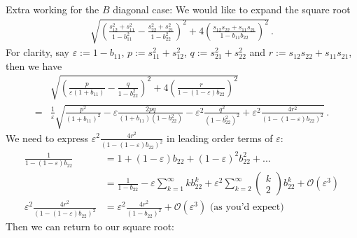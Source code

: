 Extra working for the $B$ diagonal case:
\label{extra_working}
We would like to expand the square root
\begin{align*}
\sqrt{\left(\frac{s_{12}^2+s_{11}^2}{1-b_{11}^2}-\frac{s_{22}^2+s_{21}^2}{1-b_{22}^2}\right)^2+4\left(\frac{s_{12}s_{22}+s_{11}s_{21}}{1-b_{11}b_{22}}\right)^2}\,.
\end{align*}
For clarity, say $\varepsilon:=1-b_{11}$, $p := s_{11}^2+s_{12}^2$, $q := s_{21}^2+s_{22}^2$ and $r := s_{12}s_{22}+s_{11}s_{21}$, then we have
\begin{align*}
& \sqrt{\left(\frac{p}{\varepsilon(1+b_{11})}-\frac{q}{1-b_{22}^2}\right)^2+4\left(\frac{r}{1-(1-\varepsilon) b_{22}}\right)^2}\\
=& \frac{1}{\varepsilon}\sqrt{\frac{p^2}{(1+b_{11})^2}-\varepsilon\frac{2pq}{(1+b_{11})(1-b_{22}^2)}-\varepsilon^2\frac{q^2}{(1-b_{22}^2)^2}+\varepsilon^2\frac{4r^2}{(1-(1-\varepsilon) b_{22})^2}}\,.
\end{align*}
We need to express $\varepsilon^2\frac{4r^2}{(1-(1-\varepsilon) b_{22})^2}$ in leading order terms of $\varepsilon$:\\
\begin{align*}
\frac{1}{1-(1-\varepsilon) b_{22}} &= 1+(1-\varepsilon) b_{22}+(1-\varepsilon)^2 b_{22}^2+...\\
&=\frac{1}{1-b_{22}} -
\varepsilon\sum_{k=1}^\infty kb_{22}^k + \varepsilon^2\sum_{k=2}^\infty\left(\begin{array}{c}k\\2\end{array}\right)b_{22}^k + \mathcal{O}(\varepsilon^3)\\
\varepsilon^2\frac{4r^2}{(1-(1-\varepsilon) b_{22})^2} & = \varepsilon^2\frac{4r^2}{(1-b_{22})^2}+\mathcal{O}(\varepsilon^3) \text{   (as you'd expect)}
\end{align*}
Then we can return to our square root:
